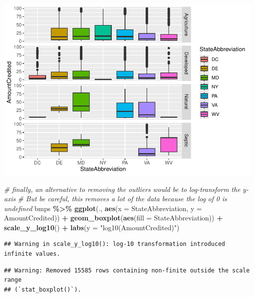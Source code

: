 \documentclass[]{article}
\newenvironment{Shaded}{\begin{snugshade}}{\end{snugshade}}
\newcommand{\AttributeTok}[1]{\textcolor[rgb]{0.13,0.29,0.53}{#1}}
\newcommand{\CommentTok}[1]{\textcolor[rgb]{0.56,0.35,0.01}{\textit{#1}}}
\newcommand{\FunctionTok}[1]{\textcolor[rgb]{0.13,0.29,0.53}{\textbf{#1}}}
\newcommand{\NormalTok}[1]{#1}
\newcommand{\SpecialCharTok}[1]{\textcolor[rgb]{0.81,0.36,0.00}{\textbf{#1}}}
\newcommand{\StringTok}[1]{\textcolor[rgb]{0.31,0.60,0.02}{#1}}
\begin{document}
\includegraphics{lab02_files/figure-latex/review3-3.pdf}

\begin{Shaded}
\begin{Highlighting}[]
\CommentTok{\# finally, an alternative to removing the outliers would be to log{-}transform the y{-}axis}
\CommentTok{\# But be careful, this removes a lot of the data because the log of 0 is undefined}
\NormalTok{bmps }\SpecialCharTok{\%\textgreater{}\%} \FunctionTok{ggplot}\NormalTok{(., }\FunctionTok{aes}\NormalTok{(}\AttributeTok{x =}\NormalTok{ StateAbbreviation, }\AttributeTok{y =}\NormalTok{ AmountCredited)) }\SpecialCharTok{+}
  \FunctionTok{geom\_boxplot}\NormalTok{(}\FunctionTok{aes}\NormalTok{(}\AttributeTok{fill =}\NormalTok{ StateAbbreviation)) }\SpecialCharTok{+}
  \FunctionTok{scale\_y\_log10}\NormalTok{() }\SpecialCharTok{+}
  \FunctionTok{labs}\NormalTok{(}\AttributeTok{y =} \StringTok{"log10(AmountCredited)"}\NormalTok{)}
\end{Highlighting}
\end{Shaded}

\begin{verbatim}
## Warning in scale_y_log10(): log-10 transformation introduced infinite values.
\end{verbatim}

\begin{verbatim}
## Warning: Removed 15585 rows containing non-finite outside the scale range
## (`stat_boxplot()`).
\end{verbatim}
\end{document}
